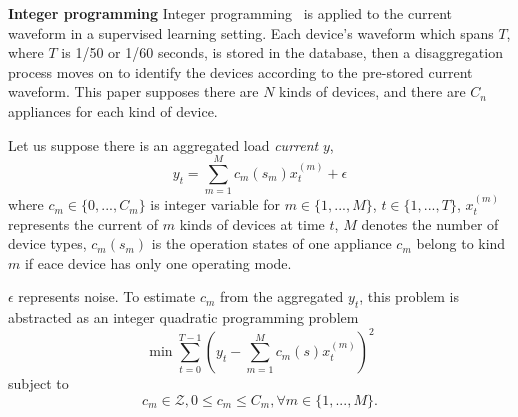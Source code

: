 \textbf{Integer programming}
Integer programming~\cite{suzuki2008nonintrusive} is applied
to the current waveform in a supervised learning setting.
Each device's waveform which spans $T$, where $T$ is 1/50 or 1/60 seconds,   
is stored in the database,
then a disaggregation process moves on to identify the
devices according to the pre-stored current waveform.
This paper supposes there are $N$ kinds of devices, 
and there are $C_n$ appliances for each kind of device. 

Let us suppose there is an aggregated load \textit{current} $y$,
\begin{equation}
y_t= \sum_{m=1}^{M}c_m(s_m)x_{t}^{(m)}+\epsilon
\end{equation}
where $c_m \in \{0,...,C_m\}$ is integer variable for $m\in\{1,...,M\}$, 
$t \in \{1,..., T\}$, 
$x_{t}^{(m)}$ represents the current of  $m$ kinds of devices at time $t$, 
$M$ denotes the number of device types, 
$c_m(s_m)$ is the operation states of one appliance $c_m$ belong to kind $m$ if 
eace device has only one operating mode. 

$\epsilon$ represents noise. 
To estimate $c_m$ from the aggregated $y_t$, 
this problem is abstracted as an integer
quadratic programming problem
\begin{equation}
\min \sum_{t=0}^{T-1}(y_t- \sum_{m=1}^{M}c_m(s)x_{t}^{(m)})^2
\end{equation}
subject to
\begin{displaymath}
c_m \in \mathcal{Z}, 0 \leq c_m \leq C_m, \forall m \in \{1,...,M \}.
\end{displaymath}





